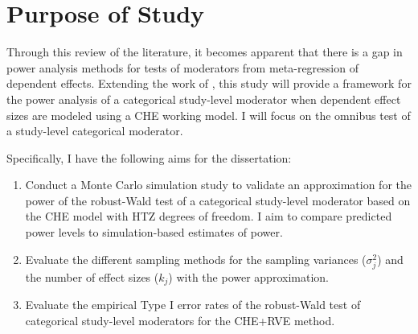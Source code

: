                             



\section{Purpose of Study}

Through this review of the literature, it becomes apparent that there is a gap in power analysis methods for tests of moderators from meta-regression of dependent effects. Extending the work of \textcite{vembye2023}, this study will provide a framework for the power analysis of a categorical study-level moderator when dependent effect sizes are modeled using a CHE working model. I will focus on the omnibus test of a study-level categorical moderator.  

Specifically, I have the following aims for the dissertation: 
\begin{enumerate}
\item Conduct a Monte Carlo simulation study to validate an approximation for the power of the robust-Wald test of a categorical study-level moderator based on the CHE model with HTZ degrees of freedom. I aim to compare predicted power levels to simulation-based estimates of power.
\item Evaluate the different sampling methods for the sampling variances ($\sigma^2_j$) and the number of effect sizes ($k_j$) with the power approximation. 
\item Evaluate the empirical Type I error rates of the robust-Wald test of categorical study-level moderators for the CHE+RVE method.
\end{enumerate}


